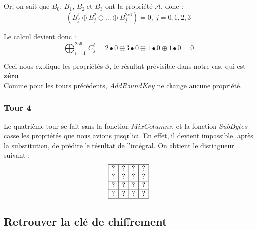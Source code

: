  \\
 \\
\noindent Or, on sait que $B_0$, $B_1$, $B_2$ et $B_3$ ont la propriété $\mathcal{A}$, donc :
$$
(B_{j}^{1} \oplus B_{j}^{2} \oplus ... \oplus B_{j}^{256}) = 0,\ j=0,1,2,3
$$

\indent Le calcul devient donc : 
$$
\bigoplus_{i=1}^{256}\ C_{j}^{i} = 2 \bullet 0 \oplus 3 \bullet 0 \oplus 1 \bullet 0 \oplus 1 \bullet 0 = 0
$$

\indent Ceci nous explique les propriétés $\mathcal{S}$, le résultat prévisible dans notre cas, qui est \textbf{zéro} \\
Comme pour les tours précédents, $AddRoundKey$ ne change aucune propriété.


\subsubsection{Tour 4}

\indent Le quatrième tour se fait sans la fonction $MixColumns$, et la fonction $SubBytes$ casse les propriétés que nous avions jusqu'ici. En effet, il devient impossible, après la substitution, de prédire le résultat de l'intégral. On obtient le distingueur suivant :
$$
\begin{array}{|c|c|c|c|}
    \hline
    ? & ? & ? & ? \\
    \hline
    ? & ? & ? & ? \\
    \hline
    ? & ? & ? & ? \\
    \hline
    ? & ? & ? & ? \\
    \hline
\end{array}
$$

\subsection{Retrouver la clé de chiffrement}

